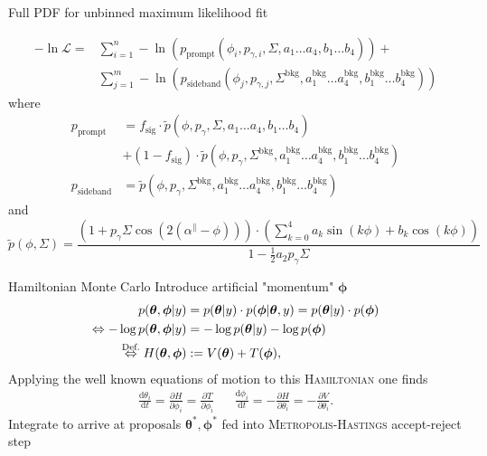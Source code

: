 \documentclass[11pt,aspectratio=169,dvipsnames]{beamer}
\begin{document}
	\begin{frame}{Full PDF for unbinned maximum likelihood fit}
		
		\begin{align*}
			-\ln\mathcal{L}=&\sum_{i=1}^{n}-\ln(p_\text{prompt}(\phi_i,p_{\gamma,i},\Sigma,a_1\dots a_4,b_1\dots b_4))+\\
			&\sum_{j=1}^{m}-\ln\left(p_\text{sideband}(\phi_j,p_{\gamma,j},\Sigma^\text{bkg},a_1^\text{bkg}\dots a_4^\text{bkg},b_1^\text{bkg}\dots b_4^\text{bkg})\right)
		\end{align*}
		where
		\begin{align*}
			p_\text{prompt}&=f_{\text{sig}}\cdot\tilde{p}(\phi,p_\gamma,\Sigma,a_1\dots a_4, b_1\dots b_4)\\ &+ \left(1-f_\text{sig}\right)\cdot\tilde{p}(\phi,p_\gamma,\Sigma^\text{bkg},a_1^\text{bkg}\dots a_4^\text{bkg}, b_1^\text{bkg}\dots b_4^\text{bkg})\\
			p_\text{sideband}&=\tilde{p}(\phi,p_\gamma,\Sigma^\text{bkg},a_1^\text{bkg}\dots a_4^\text{bkg}, b_1^\text{bkg}\dots b_4^\text{bkg})
		\end{align*}
		and \begin{equation*}
			\tilde{p}(\phi,\Sigma)=\frac{\left(1+p_\gamma\Sigma\cos\left(2\left(\alpha^\parallel-\phi\right)\right)\right)\cdot\left(\sum_{k=0}^{4}a_k\sin(k\phi)+b_k\cos(k\phi)\right)}{1-\frac{1}{2}a_2p_\gamma\Sigma}
		\end{equation*}
		
	\end{frame}
	\begin{frame}{Hamiltonian Monte Carlo}
		Introduce artificial "momentum" $\boldsymbol{\phi}$
		\begin{equation*}
			\begin{aligned}
				p(\boldsymbol{\theta},\boldsymbol{\phi}|y)&=p(\boldsymbol{\theta}|y)\cdot p(\boldsymbol{\phi}|\boldsymbol{\theta},y)=p(\boldsymbol{\theta}|y)\cdot p(\boldsymbol{\phi})\\
				\Leftrightarrow-\log p(\boldsymbol{\theta},\boldsymbol{\phi}|y)&=-\log p(\boldsymbol{\theta}|y)-\log p(\boldsymbol{\phi})\\
				\overset{\text{Def.}}{\Leftrightarrow} H(\boldsymbol{\theta},\boldsymbol{\phi}) &:=V(\boldsymbol{\theta})+T(\boldsymbol{\phi}), 	
			\end{aligned}
		\end{equation*} 
	Applying the well known equations of motion to this \textsc{Hamiltonian} one finds 
	\begin{align*}
		\frac{\text{d}\theta_i}{\text{d}t}=\frac{\partial H}{\partial \phi_i}=\frac{\partial T}{\partial \phi_i} && \frac{\text{d}\phi_i}{\text{d}t}=-\frac{\partial H}{\partial \theta_i}=-\frac{\partial V}{\partial \theta_i}.
	\end{align*}
Integrate to arrive at proposals $\boldsymbol{\theta^*},\boldsymbol{\phi^*}$ fed into \textsc{Metropolis-Hastings} accept-reject step
	\end{frame}
\end{document}
